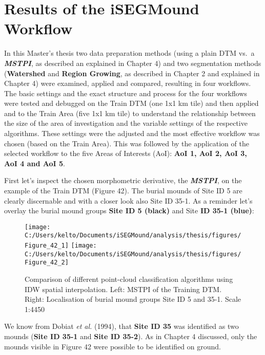 \documentclass[
  12pt,
]{article}
\begin{document}
\vspace{5mm}
\justifying

\hypertarget{results-of-the-isegmound-workflow}{%
\section{Results of the iSEGMound Workflow}\label{results-of-the-isegmound-workflow}}

In this Master's thesis two data preparation methods (using a plain DTM vs.~a \textbf{\emph{MSTPI}}, as described an explained in Chapter 4) and two segmentation methods (\textbf{Watershed} and \textbf{Region Growing}, as described in Chapter 2 and explained in Chapter 4) were examined, applied and compared, resulting in four workflows. The basic settings and the exact structure and process for the four workflows were tested and debugged on the Train DTM (one 1x1 km tile) and then applied and to the Train Area (five 1x1 km tile) to understand the relationship between the size of the area of investigation and the variable settings of the respective algorithms. These settings were the adjusted and the most effective workflow was chosen (based on the Train Area). This was followed by the application of the selected workflow to the five Areas of Interests (AoI): \textbf{AoI 1, AoI 2, AoI 3, AoI 4 and AoI 5}.

First let's inspect the chosen morphometric derivative, the \textbf{\emph{MSTPI}}, on the example of the Train DTM (Figure 42). The burial mounds of Site ID 5 are clearly discernable and with a closer look also Site ID 35-1. As a reminder let's overlay the burial mound groups \textbf{Site ID 5 (black)} and Site \textbf{ID 35-1 (blue)}:

\begin{figure}
\texttt{[image: C:/Users/kelto/Documents/iSEGMound/analysis/thesis/figures/Figure\_42\_1]} \texttt{[image: C:/Users/kelto/Documents/iSEGMound/analysis/thesis/figures/Figure\_42\_2]} \caption{Comparison of different point-cloud classification algorithms using IDW spatial interpolation. Left: MSTPI of the Training DTM. Right: Localisation of burial mound groups Site ID 5 and 35-1. Scale 1:4450}\label{fig:Figure42}
\end{figure}

We know from Dobiat \emph{et al.} (1994), that \textbf{Site ID 35} was identified as two mounds (\textbf{Site ID 35-1} and \textbf{Site ID 35-2}). As in Chapter 4 discussed, only the mounds visible in Figure 42 were possible to be identified on ground.
\end{document}
